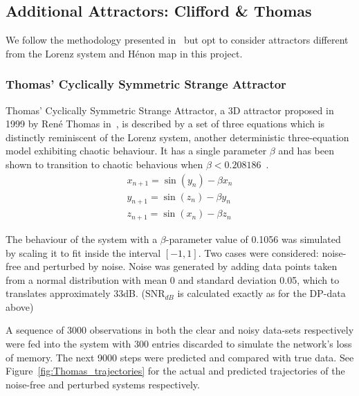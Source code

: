 \subsection{Additional Attractors: Clifford \& Thomas}
We follow the methodology presented in~\cite{manjunath2021universal} but opt to consider attractors different from the Lorenz system and H\'enon map in this project.

\subsubsection{Thomas' Cyclically Symmetric Strange Attractor}\label{Thomas_Attractor}
Thomas' Cyclically Symmetric Strange Attractor, a 3D attractor proposed in 1999 by Ren\'e Thomas in~\cite{ThomasAttractor}, is described by a set of three equations which is distinctly reminiscent of the Lorenz system, another deterministic three-equation model exhibiting chaotic behaviour. It has a single parameter $\beta$ and has been shown to transition to chaotic behavious when $\beta<0.208186$~\cite{Thomas_BetaParameter}.
\begin{eqnarray}\label{eqns_thomas}
  x_{n+1} = \sin(y_n) - \beta{x_n} \\
  y_{n+1} = \sin(z_n) - \beta{y_n} \\
  z_{n+1} = \sin(x_n) - \beta{z_n}
\end{eqnarray}

The behaviour of the system with a $\beta$-parameter value of 0.1056 was simulated by scaling it to fit inside the interval $[-1,1]$. Two cases were considered: noise-free and perturbed by noise. 
Noise was generated  by adding data points taken from a normal distribution with mean 0 and standard deviation 0.05, which to translates approximately 33dB. 
($\text{SNR}_{dB}$ is calculated exactly as for the DP-data above)

A sequence of 3000 observations in both the clear and noisy data-sets respectively were fed into the system with 300 entries discarded to simulate the network's loss of memory. 
The next 9000 steps were predicted and compared with true data. See Figure~\ref{fig:Thomas_trajectories} for the actual and predicted trajectories of the noise-free and perturbed systems respectively. 

